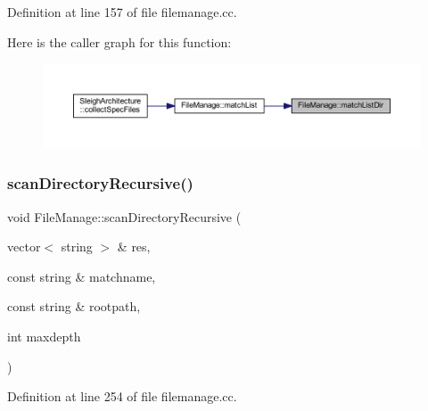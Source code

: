 Definition at line 157 of file filemanage.\+cc.

Here is the caller graph for this function\+:
\nopagebreak
\begin{figure}[H]
\begin{center}
\leavevmode
\includegraphics[width=350pt]{class_file_manage_ab0a82bdd34c86126156263e732bcbca4_icgraph}
\end{center}
\end{figure}
\mbox{\label{class_file_manage_ab6197b51380f92ab7cd595edc96efb47}} 
\subsubsection{\texorpdfstring{scanDirectoryRecursive()}{scanDirectoryRecursive()}}
{\footnotesize\ttfamily void File\+Manage\+::scan\+Directory\+Recursive (\begin{DoxyParamCaption}\item[{vector$<$ string $>$ \&}]{res,  }\item[{const string \&}]{matchname,  }\item[{const string \&}]{rootpath,  }\item[{int}]{maxdepth }\end{DoxyParamCaption})\hspace{0.3cm}{\ttfamily [static]}}



Definition at line 254 of file filemanage.\+cc.

